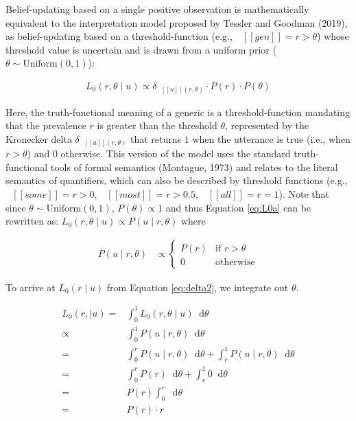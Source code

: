 \documentclass[floatsintext,doc]{apa6}
\begin{document}
Belief-updating based on a single positive observation is mathematically equivalent to the interpretation model proposed by Tessler and Goodman (2019), as belief-updating based on a threshold-function (e.g., \(\mbox{ $[\![ gen ]\!]$} = r > \theta\)) whose threshold value is uncertain and is drawn from a uniform prior (\(\theta \sim \text{Uniform}(0, 1)\)):

\begin{align}
L_0(r, \theta \mid u) \propto {\delta_{\mbox{ $[\![ u ]\!]$}(r, \theta)} \cdot P(r) \cdot P(\theta)} \label{eq:L0a}
\end{align}

Here, the truth-functional meaning of a generic is a threshold-function mandating that the prevalence \(r\) is greater than the threshold \(\theta\), represented by the Kronecker delta \(\delta_{\mbox{ $[\![ u ]\!]$}(r, \theta)}\) that returns \(1\) when the utterance is true (i.e., when \(r > \theta\)) and \(0\) otherwise.
%
%
This version of the model uses the standard truth-functional tools of formal semantics (Montague, 1973) and relates to the literal semantics of quantifiers, which can also be described by threshold functions (e.g., \(\mbox{ $[\![ some ]\!]$} = r > 0\), \(\mbox{ $[\![ most ]\!]$} = r > 0.5\), \(\mbox{ $[\![ all ]\!]$} = r = 1\)).
Note that since \(\theta \sim \text{Uniform}(0, 1)\),  \(P(\theta) \propto 1\)  and thus Equation \ref{eq:L0a} can be rewritten as: \(L_0(r, \theta \mid u) \propto P(u \mid r, \theta)\) where

\begin{align}
P(u \mid r, \theta)  &\propto \begin{cases}
P(r) & \text{if } r > \theta \\
0 & \text{otherwise} \end{cases} \label{eq:delta2}
\end{align}

\noindent To arrive at \(L_0(r \mid u)\) from Equation \ref{eq:delta2}, we integrate out \(\theta\).

\begin{align}
L_0(r, \mid u) =& \int_{0}^{1} L_0(r, \theta \mid u) \mathop{}\!\mathrm{d}\theta \nonumber \\
\propto& \int_{0}^{1} P(u \mid r, \theta)  \mathop{}\!\mathrm{d}\theta \nonumber \\
=& \int_{0}^{r} P(u \mid r, \theta) \mathop{}\!\mathrm{d}\theta + \int_{r}^{1}P(u \mid r, \theta) \mathop{}\!\mathrm{d}\theta \nonumber \\
=& \int_{0}^{r} P(r) \mathop{}\!\mathrm{d}\theta + \int_{r}^{1} 0 \mathop{}\!\mathrm{d}\theta \nonumber  \\ 
   = &  P(r) \int_{0}^{r} \mathop{}\!\mathrm{d}\theta \nonumber \\
     = &   P(r) \cdot r \label{eq:L0d}
\end{align}
\end{document}

